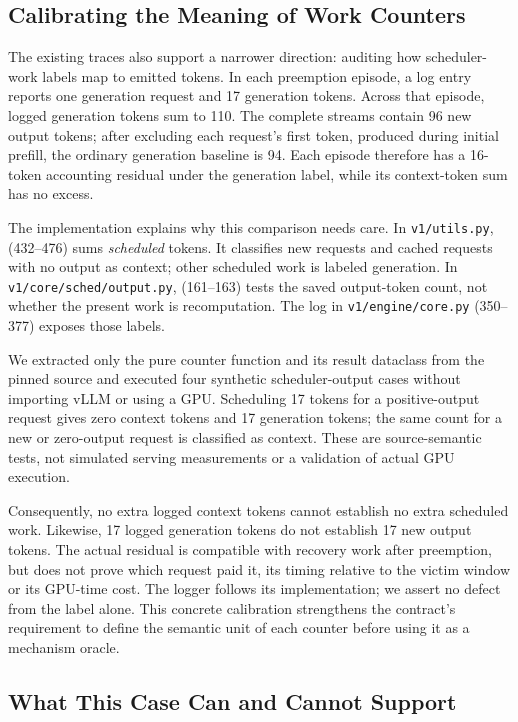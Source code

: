 \documentclass[a4paper,twoside]{article}
\begin{document}
\subsection{Calibrating the Meaning of Work Counters}

The existing traces also support a narrower direction: auditing how scheduler-work labels map to emitted tokens. In each preemption episode, a log entry reports one generation request and 17 generation tokens. Across that episode, logged generation tokens sum to 110. The complete streams contain 96 new output tokens; after excluding each request's first token, produced during initial prefill, the ordinary generation baseline is 94. Each episode therefore has a 16-token accounting residual under the generation label, while its context-token sum has no excess.

The implementation explains why this comparison needs care. In \texttt{v1/utils.py},  (432--476) sums \emph{scheduled} tokens. It classifies new requests and cached requests with no output as context; other scheduled work is labeled generation. In \texttt{v1/core/sched/output.py},  (161--163) tests the saved output-token count, not whether the present work is recomputation. The log in \texttt{v1/engine/core.py} (350--377) exposes those labels.

We extracted only the pure counter function and its result dataclass from the pinned source and executed four synthetic scheduler-output cases without importing vLLM or using a GPU. Scheduling 17 tokens for a positive-output request gives zero context tokens and 17 generation tokens; the same count for a new or zero-output request is classified as context. These are source-semantic tests, not simulated serving measurements or a validation of actual GPU execution.

Consequently, no extra logged context tokens cannot establish no extra scheduled work. Likewise, 17 logged generation tokens do not establish 17 new output tokens. The actual residual is compatible with recovery work after preemption, but does not prove which request paid it, its timing relative to the victim window or its GPU-time cost. The logger follows its implementation; we assert no defect from the label alone. This concrete calibration strengthens the contract's requirement to define the semantic unit of each counter before using it as a mechanism oracle.

\subsection{What This Case Can and Cannot Support}
\end{document}
